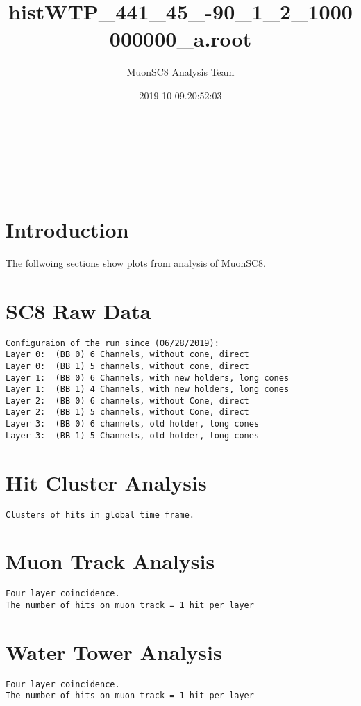 \documentclass[a4paper,11pt]{article}
\makeatletter
\newcommand{\linia}{\rule{\linewidth}{0.5pt}}
\theoremstyle{mytheor}
\renewcommand{\maketitle}{
\begin{center}
\vspace{2ex}
{\huge \textsc{\@title}}
\vspace{1ex}
\\
\linia\\
\@author \hfill \@date
\vspace{4ex}
\end{center}
}
\makeatother
\begin{document}
\title{histWTP\_441\_45\_-90\_1\_2\_1000000000\_a.root}

\author{MuonSC8 Analysis Team }

\date{2019-10-09.20:52:03}

\maketitle

\section{Introduction}

The follwoing sections show plots from analysis of MuonSC8. 






\section{SC8 Raw Data} 
\begin{verbatim} 
Configuraion of the run since (06/28/2019): 
Layer 0:  (BB 0) 6 Channels, without cone, direct 
Layer 0:  (BB 1) 5 channels, without cone, direct 
Layer 1:  (BB 0) 6 Channels, with new holders, long cones 
Layer 1:  (BB 1) 4 Channels, with new holders, long cones 
Layer 2:  (BB 0) 6 channels, without Cone, direct 
Layer 2:  (BB 1) 5 channels, without Cone, direct 
Layer 3:  (BB 0) 6 channels, old holder, long cones 
Layer 3:  (BB 1) 5 Channels, old holder, long cones 
\end{verbatim} 
\newpage 
\section{Hit Cluster Analysis} 
\begin{verbatim} 
Clusters of hits in global time frame. 
\end{verbatim} 
\newpage 
\section{Muon Track Analysis} 
\begin{verbatim} 
Four layer coincidence. 
The number of hits on muon track = 1 hit per layer  
\end{verbatim} 
\newpage 
\section{Water Tower Analysis} 
\begin{verbatim} 
Four layer coincidence. 
The number of hits on muon track = 1 hit per layer 
\end{verbatim} 
\end{document}
